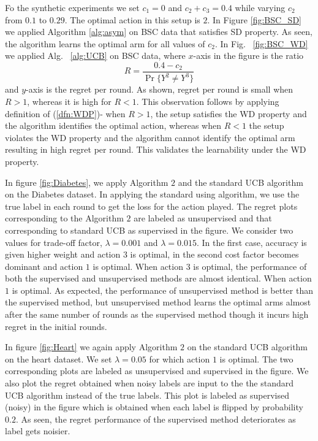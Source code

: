Fo the synthetic experiments we set $c_1=0$ and $c_2+c_3=0.4$ while varying $c_2$ from $0.1$ to $0.29$. The optimal action in this setup is $2$. In Figure \ref{fig:BSC_SD} we applied Algorithm \ref{alg:asym} on BSC data that satisfies SD property. As seen, the algorithm learns the optimal arm for all values of $c_2$. In Fig. ~\ref{fig:BSC_WD} 
we applied Alg. ~\ref{alg:UCB} on BSC data, where $x$-axis in the figure is the ratio
\[R= \frac{0.4 - c_2}{\Pr\{Y^2 \neq Y^3\}}\]
and $y$-axis is the regret per round. As shown, regret per round is small when $R>1$, whereas it is high for $R<1$. This observation follows by applying definition of (\ref{dfn:WDP})- when $R>1$, the setup satisfies the WD property and the algorithm identifies the optimal action, whereas when $R<1$ the setup violates the WD property and the algorithm cannot identify the optimal arm resulting in high regret per round. This validates the learnability under the WD property. 

In figure \ref{fig:Diabetes}, we apply Algorithm $2$ and the standard UCB algorithm on the Diabetes dataset. In applying the standard using algorithm, we use the true label in each round to get the loss for the action played. The regret plots corresponding to the Algorithm $2$ are labeled as unsupervised and that corresponding to standard UCB as supervised in the figure. We consider two values for trade-off factor, $\lambda=0.001$ and $\lambda=0.015$. In the first case, accuracy is given higher weight and action $3$ is optimal, in the second cost factor becomes dominant and action $1$ is optimal. When action $3$ is optimal, the performance of both the supervised and unsupervised methods are almost identical. When action $1$ is optimal. As expected, the performance of unsupervised method is better than the supervised method, but unsupervised method learns the optimal arms almost after the same number of rounds as the supervised method though it incurs high regret in the initial rounds.


In figure \ref{fig:Heart} we again apply Algorithm $2$ on the standard UCB algorithm on the heart dataset. We set $\lambda=0.05$ for which action $1$ is optimal. The two corresponding plots are labeled as unsupervised and supervised in the figure. We also plot the regret obtained when noisy labels are input to the 
the standard UCB algorithm instead of the true labels. This plot is labeled as supervised (noisy) in the figure which is obtained when each label is flipped by probability $0.2$. As seen, the regret performance of the supervised method deteriorates as label gets noisier. 


